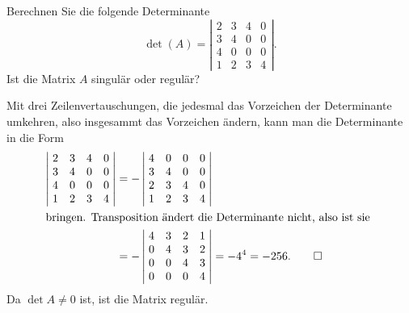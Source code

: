 Berechnen Sie die folgende Determinante
\[
\operatorname{det} (A) = \left|
\begin{matrix}
2&3&4&0\\
3&4&0&0\\
4&0&0&0\\
1&2&3&4
\end{matrix}
\right|.
\]
Ist die Matrix $A$ singulär oder regulär? 


\begin{loesung}
Mit drei Zeilenvertauschungen, die jedesmal das Vorzeichen der
Determinante umkehren, also insgesammt das Vorzeichen ändern,
kann man die Determinante in die Form
\begin{align*}
\left|\;
\begin{matrix}
2&3&4&0\\
3&4&0&0\\
4&0&0&0\\
1&2&3&4
\end{matrix}\;
\right|
&=
-\left|\;
\begin{matrix}
4&0&0&0\\
3&4&0&0\\
2&3&4&0\\
1&2&3&4
\end{matrix}\;
\right|
\\
\intertext{%
bringen. Transposition ändert die Determinante nicht, also ist sie
}
&=
-\left|\;
\begin{matrix}
4&3&2&1\\
0&4&3&2\\
0&0&4&3\\
0&0&0&4
\end{matrix}\;
\right|=-4^4=-256.
\qedhere
\end{align*}
Da $\det A \neq 0$ ist, ist die Matrix regulär.
\end{loesung}

